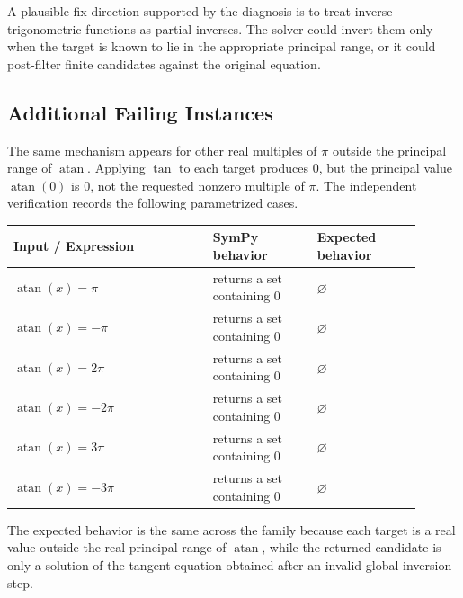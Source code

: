 \documentclass[11pt]{article}
\begin{document}
A plausible fix direction supported by the diagnosis is to treat inverse
trigonometric functions as partial inverses.  The solver could invert them only
when the target is known to lie in the appropriate principal range, or it could
post-filter finite candidates against the original equation.

\subsection{Additional Failing Instances}

The same mechanism appears for other real multiples of \(\pi\) outside the
principal range of \(\operatorname{atan}\).  Applying \(\tan\) to each target
produces \(0\), but the principal value \(\operatorname{atan}(0)\) is \(0\), not
the requested nonzero multiple of \(\pi\).  The independent verification records
the following parametrized cases.

\begin{center}
\small
\renewcommand{\arraystretch}{1.3}
\begin{tabular}{@{}>{\raggedright\arraybackslash}p{0.44\linewidth}>{\raggedright\arraybackslash}p{0.23\linewidth}>{\raggedright\arraybackslash}p{0.23\linewidth}@{}}
\toprule
\textbf{Input / Expression} & \textbf{SymPy behavior} & \textbf{Expected behavior} \\
\midrule
\(\operatorname{atan}(x) = \pi\) & returns a set containing \(0\) & \(\varnothing\) \\
\(\operatorname{atan}(x) = -\pi\) & returns a set containing \(0\) & \(\varnothing\) \\
\(\operatorname{atan}(x) = 2\pi\) & returns a set containing \(0\) & \(\varnothing\) \\
\(\operatorname{atan}(x) = -2\pi\) & returns a set containing \(0\) & \(\varnothing\) \\
\(\operatorname{atan}(x) = 3\pi\) & returns a set containing \(0\) & \(\varnothing\) \\
\(\operatorname{atan}(x) = -3\pi\) & returns a set containing \(0\) & \(\varnothing\) \\
\bottomrule
\end{tabular}
\end{center}

The expected behavior is the same across the family because each target is a
real value outside the real principal range of \(\operatorname{atan}\), while the
returned candidate is only a solution of the tangent equation obtained after an
invalid global inversion step.
\end{document}
